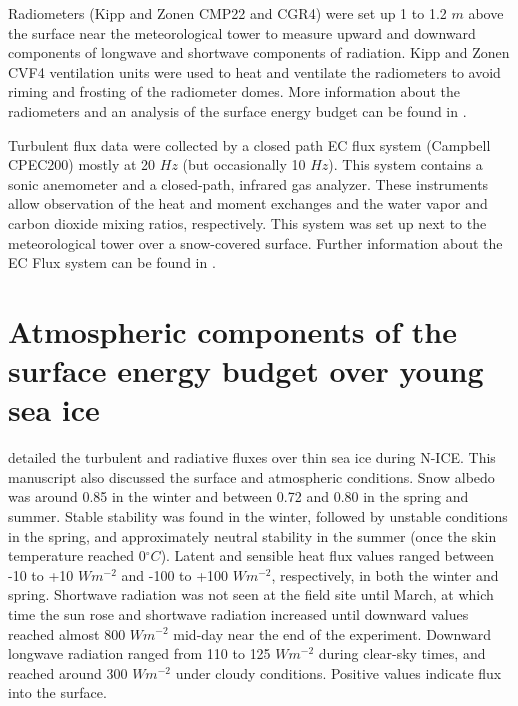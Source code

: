 Radiometers (Kipp and Zonen CMP22 and CGR4) were set up 1 to 1.2 $m$ above the surface near the meteorological tower to measure upward and downward components of longwave and shortwave components of radiation. Kipp and Zonen CVF4 ventilation units were used to heat and ventilate the radiometers to avoid riming and frosting of the radiometer domes. More information about the radiometers and an analysis of the surface energy budget can be found in \citet{walden:2017}.

Turbulent flux data were collected by a closed path EC flux system (Campbell CPEC200) mostly at  20 $Hz$ (but occasionally 10 $Hz$). This system contains a sonic anemometer and a closed-path, infrared gas analyzer. These instruments allow observation of the heat and moment exchanges and the water vapor and carbon dioxide mixing ratios, respectively. This system was set up next to the meteorological tower over a snow-covered surface. Further information about the EC Flux system can be found in \citet{walden:2017}.

\section{Atmospheric components of the surface energy budget over young sea ice}
\citet{walden:2017} detailed the turbulent and radiative fluxes over thin sea ice during N-ICE. This manuscript also discussed the surface and atmospheric conditions. Snow albedo was around 0.85 in the winter and between 0.72 and 0.80 in the spring and summer. Stable stability was found in the winter, followed by unstable conditions in the spring, and approximately neutral stability in the summer (once the skin temperature reached 0$^{\circ}C$). Latent and sensible heat flux values ranged between -10 to +10 $Wm^{-2}$ and -100 to +100 $Wm^{-2}$, respectively, in both the winter and spring. Shortwave radiation was not seen at the field site until March, at which time the sun rose and shortwave radiation increased until downward values reached almost 800 $Wm^{-2}$ mid-day near the end of the experiment. Downward longwave radiation ranged from 110 to 125 $Wm^{-2}$ during clear-sky times, and reached around 300 $Wm^{-2}$ under cloudy conditions. Positive values indicate flux into the surface.

